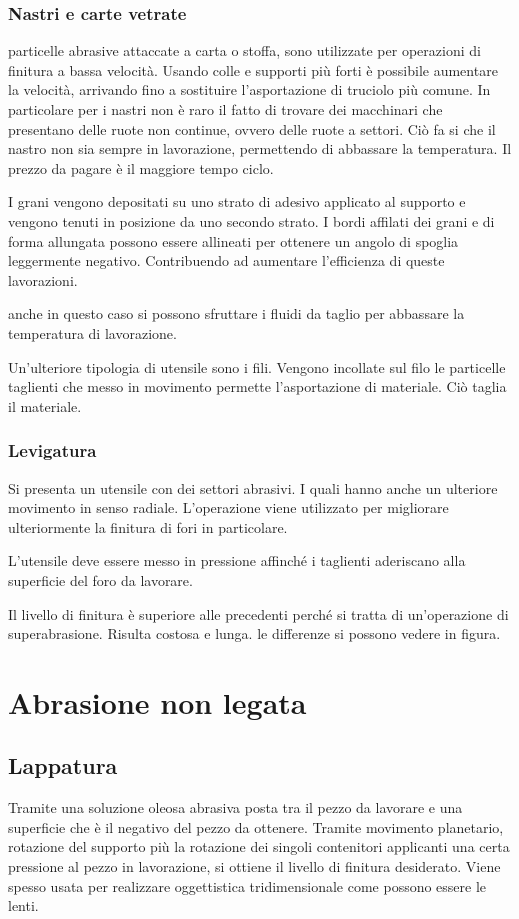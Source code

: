 \subsubsection{Nastri e carte vetrate}
particelle abrasive attaccate a carta o stoffa, sono utilizzate per operazioni di finitura a bassa velocità.
Usando colle e  supporti più forti è possibile aumentare la velocità, arrivando fino a sostituire l'asportazione di truciolo più comune.
In particolare per i nastri non è raro il fatto di trovare dei macchinari che presentano delle ruote non continue, ovvero delle ruote a settori.
Ciò fa si che il nastro non sia sempre in lavorazione, permettendo di abbassare la temperatura. Il prezzo da pagare è il maggiore tempo ciclo.

I grani vengono depositati su uno strato di adesivo applicato al supporto e vengono tenuti in posizione da uno secondo strato.
I bordi affilati dei grani e di forma allungata possono essere allineati per ottenere un angolo di spoglia leggermente negativo. Contribuendo ad aumentare l'efficienza di queste lavorazioni.

anche in questo caso si possono sfruttare i fluidi da taglio per abbassare la temperatura di lavorazione.

Un'ulteriore tipologia di utensile sono i fili. Vengono incollate sul filo le particelle taglienti che messo in movimento permette l'asportazione di materiale. Ciò taglia il materiale.

\subsubsection{Levigatura}
Si presenta un utensile con dei settori abrasivi. I quali hanno anche un ulteriore movimento in senso radiale. L'operazione viene utilizzato per migliorare ulteriormente la finitura di fori in particolare.

L'utensile deve essere messo in pressione affinché i taglienti aderiscano alla superficie del foro da lavorare.

Il livello di finitura è superiore alle precedenti perché si tratta  di un'operazione di superabrasione. Risulta costosa e lunga. le differenze si possono vedere in figura.

\section{Abrasione non legata}
\subsection{Lappatura}
Tramite una soluzione oleosa abrasiva posta tra il pezzo da lavorare e una superficie che è il negativo del pezzo da ottenere.
Tramite movimento planetario, rotazione del supporto più la rotazione dei singoli contenitori applicanti una certa pressione al pezzo in lavorazione, si ottiene il livello di finitura desiderato.
Viene spesso usata per realizzare oggettistica tridimensionale come possono essere le lenti.


